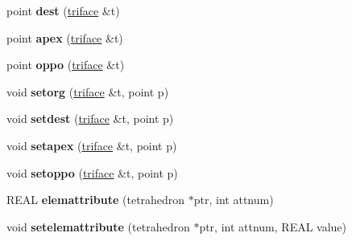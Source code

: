 \begin{DoxyCompactItemize}
\item 
\hypertarget{classtetgenmesh_ad56ef3448cd57e637acf373622bfb769}{point {\bfseries dest} (\hyperlink{classtetgenmesh_1_1triface}{triface} \&t)}\label{classtetgenmesh_ad56ef3448cd57e637acf373622bfb769}

\item 
\hypertarget{classtetgenmesh_a9287d941f7f432ca846d5c004603af40}{point {\bfseries apex} (\hyperlink{classtetgenmesh_1_1triface}{triface} \&t)}\label{classtetgenmesh_a9287d941f7f432ca846d5c004603af40}

\item 
\hypertarget{classtetgenmesh_a2ff33d38976a7bc134380ef8f15c4519}{point {\bfseries oppo} (\hyperlink{classtetgenmesh_1_1triface}{triface} \&t)}\label{classtetgenmesh_a2ff33d38976a7bc134380ef8f15c4519}

\item 
\hypertarget{classtetgenmesh_a6ae234588aff3334e96cd1798d6e3129}{void {\bfseries setorg} (\hyperlink{classtetgenmesh_1_1triface}{triface} \&t, point p)}\label{classtetgenmesh_a6ae234588aff3334e96cd1798d6e3129}

\item 
\hypertarget{classtetgenmesh_a0fe745e12c7d0ce253a8d4486992ed7e}{void {\bfseries setdest} (\hyperlink{classtetgenmesh_1_1triface}{triface} \&t, point p)}\label{classtetgenmesh_a0fe745e12c7d0ce253a8d4486992ed7e}

\item 
\hypertarget{classtetgenmesh_a0f00b784db4aba3d5d3f7c7b09ed12dc}{void {\bfseries setapex} (\hyperlink{classtetgenmesh_1_1triface}{triface} \&t, point p)}\label{classtetgenmesh_a0f00b784db4aba3d5d3f7c7b09ed12dc}

\item 
\hypertarget{classtetgenmesh_abb76d76639d4f8cedc41c86d6fa2f180}{void {\bfseries setoppo} (\hyperlink{classtetgenmesh_1_1triface}{triface} \&t, point p)}\label{classtetgenmesh_abb76d76639d4f8cedc41c86d6fa2f180}

\item 
\hypertarget{classtetgenmesh_abffbd551714f2e119e0f8ba3e4e54c92}{R\-E\-A\-L {\bfseries elemattribute} (tetrahedron $\ast$ptr, int attnum)}\label{classtetgenmesh_abffbd551714f2e119e0f8ba3e4e54c92}

\item 
\hypertarget{classtetgenmesh_a0a648fdfb850a6d706e96bf62a18f761}{void {\bfseries setelemattribute} (tetrahedron $\ast$ptr, int attnum, R\-E\-A\-L value)}\label{classtetgenmesh_a0a648fdfb850a6d706e96bf62a18f761}


\end{DoxyCompactItemize}
